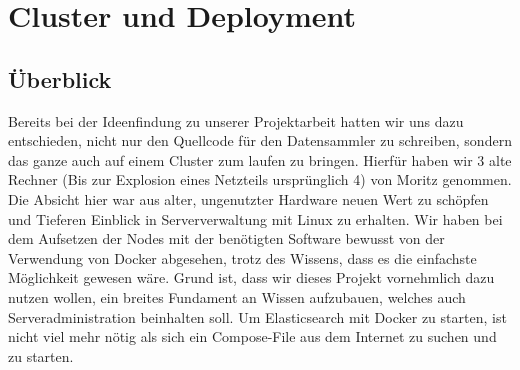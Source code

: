 \documentclass[12pt,oneside,a4paper,parskip]{scrbook}
\begin{document}
\chapter{Cluster und Deployment}
\section{Überblick} Bereits bei der Ideenfindung zu unserer Projektarbeit hatten wir uns dazu entschieden, nicht nur den Quellcode für den Datensammler zu schreiben, sondern das ganze auch auf einem Cluster zum laufen zu bringen. Hierfür haben wir 3 alte Rechner (Bis zur Explosion eines Netzteils ursprünglich 4) von Moritz genommen. Die Absicht hier war aus alter, ungenutzter Hardware neuen Wert zu schöpfen und Tieferen Einblick in Serververwaltung mit Linux zu erhalten. Wir haben bei dem Aufsetzen der Nodes mit der benötigten Software bewusst von der Verwendung von Docker abgesehen, trotz des Wissens, dass es die einfachste Möglichkeit gewesen wäre. Grund ist, dass wir dieses Projekt vornehmlich dazu nutzen wollen, ein breites Fundament an Wissen aufzubauen, welches auch Serveradministration beinhalten soll. Um Elasticsearch mit Docker zu starten, ist nicht viel mehr nötig als sich ein Compose-File aus dem Internet zu suchen und zu starten.
\end{document}
